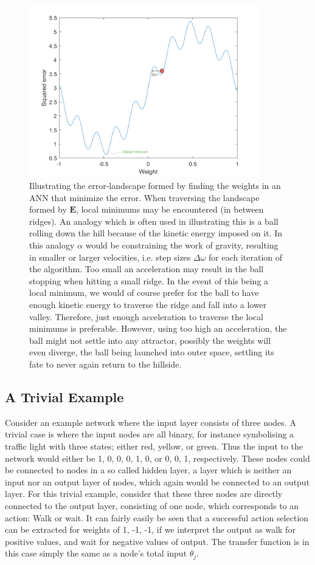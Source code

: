 \begin{figure}
\centering
\includegraphics[width=10cm]{fig/error_landscape_with_ball.png}
\caption{Illustrating the error-landscape formed by finding the weights in an ANN that minimize the error. When traversing the landscape formed by $\textbf{E}$, local minimums may be encountered (in between ridges). An analogy which is often used in illustrating this is a ball rolling down the hill because of the kinetic energy imposed on it. In this analogy $\alpha$ would be constraining the work of gravity, resulting in smaller or larger velocities, i.e. step sizes $\Delta \omega$ for each iteration of the algorithm.
Too small an acceleration may result in the ball stopping when hitting a small ridge. In the event of this being a local minimum, we would of course prefer for the ball to have enough kinetic energy to traverse the ridge and fall into a lower valley. Therefore, just enough acceleration to traverse the local minimums is preferable. However, using too high an acceleration, the ball might not settle into any attractor, possibly the weights will even diverge, the ball being launched into outer space, settling its fate to never again return to the hillside.}
\label{fig:steepest_descent}
\end{figure}

\subsection{A Trivial Example}

Consider an example network where the input layer consists of three nodes. A trivial case is where the input nodes are all binary, for instance symbolising a traffic light with three states; either red, yellow, or green. Thus the input to the network would either be {1, 0, 0}, {0, 1, 0}, or {0, 0, 1}, respectively. These nodes could be connected to nodes in a so called hidden layer, a layer which is neither an input nor an output layer of nodes, which again would be connected to an output layer. For this trivial example, consider that these three nodes are directly connected to the output layer, consisting of one node, which corresponds to an action: Walk or wait. It can fairly easily be seen that a successful action selection can be extracted for weights of {1, -1, -1}, if we interpret the output as walk for positive values, and wait for negative values of output. The transfer function is in this case simply the same as a node's total input $\theta_j$.

